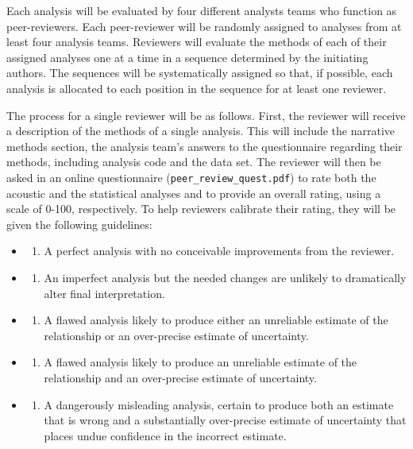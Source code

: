 \documentclass[Review,times,sageh]{sagej}
\providecommand{\tightlist}{\setlength{\itemsep}{0pt}\setlength{\parskip}{0pt}}
\begin{document}
Each analysis will be evaluated by four different analysts teams who function as peer-reviewers.
Each peer-reviewer will be randomly assigned to analyses from at least four analysis teams.
Reviewers will evaluate the methods of each of their assigned analyses one at a time in a sequence determined by the initiating authors.
The sequences will be systematically assigned so that, if possible, each analysis is allocated to each position in the sequence for at least one reviewer.

The process for a single reviewer will be as follows.
First, the reviewer will receive a description of the methods of a single analysis.
This will include the narrative methods section, the analysis team's answers to the questionnaire regarding their methods, including analysis code and the data set.
The reviewer will then be asked in an online questionnaire (\texttt{peer\_review\_quest.pdf}) to rate both the acoustic and the statistical analyses and to provide an overall rating, using a scale of 0-100, respectively.
To help reviewers calibrate their rating, they will be given the following guidelines:

\begin{itemize}
\item
  \begin{enumerate}
  \def\labelenumi{\arabic{enumi}.}
  \setcounter{enumi}{99}
  \tightlist
  \item
    A perfect analysis with no conceivable improvements from the reviewer.
  \end{enumerate}
\item
  \begin{enumerate}
  \def\labelenumi{\arabic{enumi}.}
  \setcounter{enumi}{74}
  \tightlist
  \item
    An imperfect analysis but the needed changes are unlikely to dramatically alter final interpretation.
  \end{enumerate}
\item
  \begin{enumerate}
  \def\labelenumi{\arabic{enumi}.}
  \setcounter{enumi}{49}
  \tightlist
  \item
    A flawed analysis likely to produce either an unreliable estimate of the relationship or an over-precise estimate of uncertainty.
  \end{enumerate}
\item
  \begin{enumerate}
  \def\labelenumi{\arabic{enumi}.}
  \setcounter{enumi}{24}
  \tightlist
  \item
    A flawed analysis likely to produce an unreliable estimate of the relationship and an over-precise estimate of uncertainty.
  \end{enumerate}
\item
  \begin{enumerate}
  \def\labelenumi{\arabic{enumi}.}
  \setcounter{enumi}{-1}
  \tightlist
  \item
    A dangerously misleading analysis, certain to produce both an estimate that is wrong and a substantially over-precise estimate of uncertainty that places undue confidence in the incorrect estimate.
  \end{enumerate}
\end{itemize}
\end{document}
